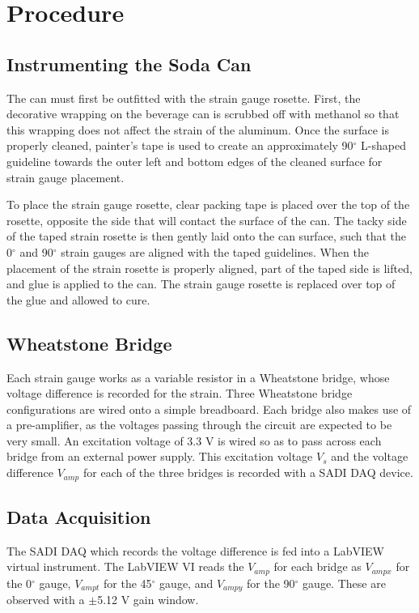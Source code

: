\documentclass[10pt,journal,letterpaper]{IEEEtran}
\begin{document}
\section{Procedure}

\subsection{Instrumenting the Soda Can}

The can must first be outfitted with the strain  gauge rosette.
First, the decorative wrapping on the beverage can is scrubbed off with methanol so that this wrapping does not affect the strain of the aluminum.
Once the surface is properly cleaned, painter's tape is used to create an approximately 90$^\circ$ L-shaped guideline towards the outer left and bottom edges of the cleaned surface for strain gauge placement.

To place the strain gauge rosette, clear packing tape is placed over the top of the rosette, opposite the side that will contact the surface of the can.
The tacky side of the taped strain rosette is then gently laid onto the can surface, such that the 0$^\circ$ and 90$^\circ$ strain gauges are aligned with the taped guidelines.
When the placement of the strain rosette is properly aligned, part of the taped side is lifted, and glue is applied to the can.
The strain gauge rosette is replaced over top of the glue and allowed to cure.

\subsection{Wheatstone Bridge}

Each strain gauge works as a variable resistor in a Wheatstone bridge, whose voltage difference is recorded for the strain.
Three Wheatstone bridge configurations are wired onto a simple breadboard.
Each bridge also makes use of a pre-amplifier, as the voltages passing through the circuit are expected to be very small.
An excitation voltage of 3.3 V is wired so as to pass across each bridge from an external power supply.
This excitation voltage $V_s$ and the voltage difference $V_{amp}$ for each of the three bridges is recorded with a SADI DAQ device.

\subsection{Data Acquisition}

The SADI DAQ which records the voltage difference is fed into a LabVIEW virtual instrument.
The LabVIEW VI reads the $V_{amp}$ for each bridge as $V_{ampx}$ for the 0$^\circ$ gauge, $V_{ampt}$  for the 45$^\circ$ gauge, and $V_{ampy}$ for the 90$^\circ$ gauge.
These are observed with a $\pm$5.12 V gain window.
\end{document}
